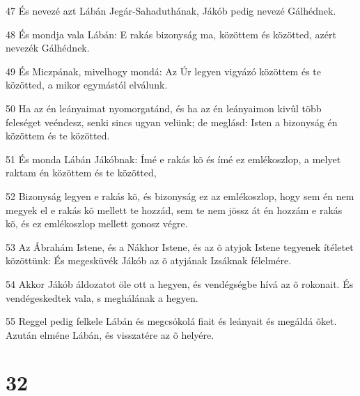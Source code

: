\par 47 És nevezé azt Lábán Jegár-Sahaduthának, Jákób pedig nevezé Gálhédnek.
\par 48 És mondja vala Lábán: E rakás bizonyság ma, közöttem és közötted, azért nevezék Gálhédnek.
\par 49 És Miczpának, mivelhogy mondá: Az Úr legyen vigyázó közöttem és te közötted, a mikor egymástól elválunk.
\par 50 Ha az én leányaimat nyomorgatánd, és ha az én leányaimon kivûl több feleséget veéndesz, senki sincs ugyan velünk; de meglásd: Isten a bizonyság én közöttem és te közötted.
\par 51 És monda Lábán Jákóbnak: Ímé e rakás kõ és ímé ez emlékoszlop, a melyet raktam én közöttem és te közötted,
\par 52 Bizonyság legyen e rakás kõ, és bizonyság ez az emlékoszlop, hogy sem én nem megyek el e rakás kõ mellett te hozzád, sem te nem jössz át én hozzám e rakás kõ, és ez emlékoszlop mellett gonosz végre.
\par 53 Az Ábrahám Istene, és a Nákhor Istene, és az õ atyjok Istene tegyenek ítéletet közöttünk: És megesküvék Jákób az õ atyjának Izsáknak félelmére.
\par 54 Akkor Jákób áldozatot öle ott a hegyen, és vendégségbe hívá az õ rokonait. És vendégeskedtek vala, s meghálának a hegyen.
\par 55 Reggel pedig felkele Lábán és megcsókolá fiait és leányait és megáldá õket. Azután elméne Lábán, és visszatére az õ helyére.

\chapter{32}

